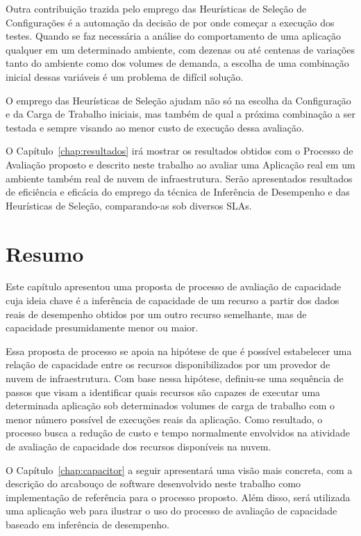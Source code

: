 Outra contribuição trazida pelo emprego das Heurísticas de Seleção de
Configurações é a automação da decisão de por onde começar a execução dos testes. Quando se faz
necessária a análise do comportamento de uma aplicação qualquer em um determinado
ambiente, com dezenas ou até centenas de variações tanto do ambiente como dos 
volumes de demanda, a escolha de uma combinação inicial dessas variáveis é um
problema de difícil solução.

O emprego das Heurísticas de Seleção ajudam não só na escolha da Configuração e 
da Carga de Trabalho iniciais, mas também de qual a próxima combinação a ser 
testada e sempre visando ao menor custo de execução dessa avaliação.

O Capítulo~\ref{chap:resultados} irá mostrar os resultados obtidos
com o Processo de Avaliação proposto e descrito neste trabalho ao avaliar uma
Aplicação real em um ambiente também real de nuvem de infraestrutura. Serão apresentados
resultados de eficiência e eficácia do emprego da técnica de Inferência de Desempenho
e das Heurísticas de Seleção, comparando-as sob diversos SLAs.

\section{Resumo}
Este capítulo apresentou uma proposta de processo de avaliação de capacidade
cuja ideia chave é a inferência de capacidade de um recurso a partir dos dados 
reais de desempenho obtidos por um outro recurso semelhante, mas de capacidade
presumidamente menor ou maior.

Essa proposta de processo se apoia na hipótese de que é possível estabelecer uma
relação de capacidade entre os recursos disponibilizados por um provedor de nuvem
de infraestrutura. Com base nessa hipótese, definiu-se uma sequência de passos
que visam a identificar quais recursos são capazes de executar uma determinada 
aplicação sob determinados volumes de carga de trabalho com o menor número
possível de execuções reais da aplicação. Como resultado, o processo busca
a redução de custo e tempo normalmente envolvidos na atividade de avaliação de
capacidade dos recursos disponíveis na nuvem.

O Capítulo~\ref{chap:capacitor} a seguir apresentará uma visão mais concreta,
com a descrição do arcabouço de software desenvolvido neste trabalho como implementação de referência
para o processo proposto. Além disso, será utilizada uma aplicação web para
ilustrar o uso do processo de avaliação de capacidade
baseado em inferência de desempenho. 

   
